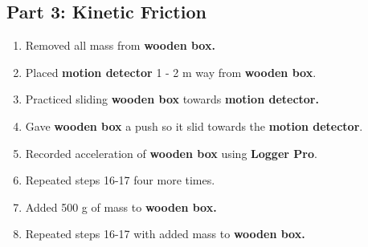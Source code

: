 \subsection{Part 3: Kinetic Friction}

\begin{enumerate}[resume]
		\item Removed all mass from \textbf{wooden box.}

		\item Placed \textbf{motion detector }1 - 2 m way from \textbf{wooden box}.

		\item Practiced sliding \textbf{wooden box }towards \textbf{motion detector.}

		\item Gave \textbf{wooden box }a push so it slid towards the \textbf{motion
			detector}.

		\item Recorded acceleration of \textbf{wooden box }using \textbf{Logger Pro}.

		\item Repeated steps 16-17 four more times.

		\item Added 500 g of mass to \textbf{wooden box.}

		\item Repeated steps 16-17 with added mass to \textbf{wooden box.}
	\end{enumerate}

\newpage





